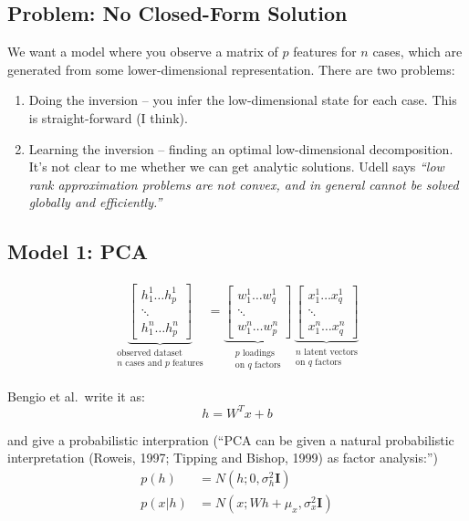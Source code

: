 \documentclass[
  10pt,
  letterpaper,
  DIV=11,
  numbers=noendperiod,
  oneside]{scrartcl}
\providecommand{\tightlist}{%
  \setlength{\itemsep}{0pt}\setlength{\parskip}{0pt}}\usepackage{longtable,booktabs,array}
\newcommand{\bm}[1]{\boldsymbol{#1}}
\newcommand{\utt}[3]{\underbrace{#1}_{\substack{\text{#2}\\\text{#3}}}}
\begin{document}
\subsection{Problem: No Closed-Form
Solution}\label{problem-no-closed-form-solution}

We want a model where you observe a matrix of \(p\) features for \(n\)
cases, which are generated from some lower-dimensional representation.
There are two problems:

\begin{enumerate}
\def\labelenumi{\arabic{enumi}.}
\tightlist
\item
  Doing the inversion -- you infer the low-dimensional state for each
  case. This is straight-forward (I think).
\item
  Learning the inversion -- finding an optimal low-dimensional
  decomposition. It's not clear to me whether we can get analytic
  solutions. Udell says \emph{``low rank approximation problems are not
  convex, and in general cannot be solved globally and efficiently.''}
\end{enumerate}

\subsection{Model 1: PCA}\label{model-1-pca}

\[\begin{aligned}
      \utt{\begin{bmatrix}h_1^1  \ldots h_p^1 \\ \ddots \\ h_1^n \ldots h_p^n\end{bmatrix}}{observed dataset}{$n$ cases and $p$ features}
         = \utt{\begin{bmatrix}w_1^1  \ldots w_q^1 \\ \ddots \\ w_1^n  \ldots w_p^n\end{bmatrix}}{$p$ loadings}{on $q$ factors}
          \utt{\begin{bmatrix}x_1^1  \ldots x_q^1 \\ \ddots \\ x_1^n  \ldots x_q^n\end{bmatrix}}{$n$ latent vectors}{on $q$ factors}
\end{aligned}
\]

Bengio et al.~write it as: \[h=W^Tx+b\]

and give a probabilistic interpration (``PCA can be given a natural
probabilistic interpretation (Roweis, 1997; Tipping and Bishop, 1999) as
factor analysis:'') \[\begin{aligned} p(h)&=N(h;0,\sigma_h^2\bm{I})\\
   p(x|h) &= N(x;Wh+\mu_x,\sigma_x^2\bm{I})
\end{aligned}
\]
\end{document}
